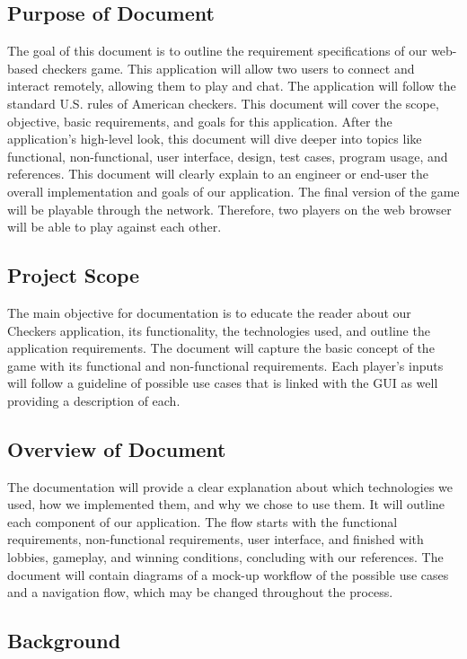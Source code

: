 \documentclass[10pt]{article}
\begin{document}
\subsection{Purpose of Document}
The goal of this document is to outline the requirement specifications of our web-based checkers game. 
This application will allow two users to connect and interact remotely, allowing them to play and chat.
The application will follow the standard U.S. rules of American checkers. 
This document will cover the scope, objective, basic requirements, and goals for this application. 
After the application's high-level look, this document will dive deeper into topics like functional, 
non-functional, user interface, design, test cases, program usage, and references. 
This document will clearly explain to an engineer or end-user the overall implementation 
and goals of our application. The final version of the game will be playable through the network. Therefore, 
two players on the web browser will be able to play against each other.

\subsection{Project Scope}
The main objective for documentation is to educate the reader about our Checkers application, 
its functionality, the technologies used, and outline the application requirements.
The document will capture the basic concept of the game with its functional and non-functional requirements. 
Each player’s inputs will follow a guideline of possible use cases that is linked with the GUI as well providing a description of each.

\subsection{Overview of Document}
The documentation will provide a clear explanation about which technologies we used, 
how we implemented them, and why we chose to use them. It will outline each component 
of our application. The flow starts with the functional requirements, non-functional requirements, 
user interface, and finished with lobbies, gameplay, and winning conditions, concluding with our references.
The document will contain diagrams of a mock-up workflow of the possible use cases and a navigation flow, which may be changed throughout the process. 

\subsection{Background}
\end{document}
